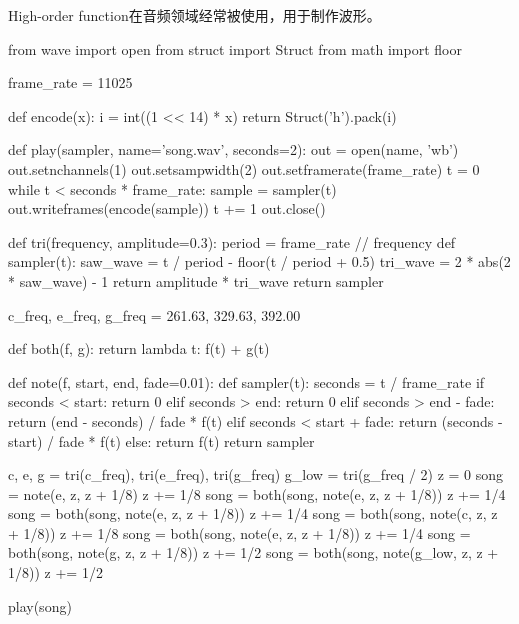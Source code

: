 \documentclass{article}
\begin{document}
        High-order function在音频领域经常被使用，用于制作波形。
        \begin{codeblock}[language=python, caption={mario}]
          from wave import open
          from struct import Struct
          from math import floor

          frame_rate = 11025

          def encode(x):
              i = int((1 << 14) * x)
              return Struct('h').pack(i)

          def play(sampler, name='song.wav', seconds=2):
              out = open(name, 'wb')
              out.setnchannels(1)
              out.setsampwidth(2)
              out.setframerate(frame_rate)
              t = 0
              while t < seconds * frame_rate:
                  sample = sampler(t)
                  out.writeframes(encode(sample))
                  t += 1
              out.close()

          def tri(frequency, amplitude=0.3):
              period = frame_rate // frequency
              def sampler(t):
                  saw_wave = t / period - floor(t / period + 0.5)
                  tri_wave = 2 * abs(2 * saw_wave) - 1
                  return amplitude * tri_wave
              return sampler

          c_freq, e_freq, g_freq = 261.63, 329.63, 392.00

          def both(f, g):
              return lambda t: f(t) + g(t)

          def note(f, start, end, fade=0.01):
              def sampler(t):
                  seconds = t / frame_rate
                  if seconds < start:
                      return 0
                  elif seconds > end:
                      return 0
                  elif seconds > end - fade:
                      return (end - seconds) / fade * f(t)
                  elif seconds < start + fade:
                      return (seconds - start) / fade * f(t)
                  else:
                      return f(t)
              return sampler

          c, e, g = tri(c_freq), tri(e_freq), tri(g_freq)
          g_low = tri(g_freq / 2)
          z = 0
          song = note(e, z, z + 1/8)
          z += 1/8
          song = both(song, note(e, z, z + 1/8))
          z += 1/4
          song = both(song, note(e, z, z + 1/8))
          z += 1/4
          song = both(song, note(c, z, z + 1/8))
          z += 1/8
          song = both(song, note(e, z, z + 1/8))
          z += 1/4
          song = both(song, note(g, z, z + 1/8))
          z += 1/2
          song = both(song, note(g_low, z, z + 1/8))
          z += 1/2

          play(song)
        \end{codeblock}
\end{document}
